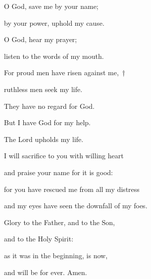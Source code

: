 \noindent O God, save me by your name;~\GreStar{}~\nopagebreak

by your power, uphold my cause.

\noindent O God, hear my prayer;~\GreStar{}~\nopagebreak

listen to the words of my mouth.

\noindent For proud men have risen against me,~†~\nopagebreak

ruthless men seek my life.~\GreStar{}~\nopagebreak

They have no regard for God.

\noindent But I have God for my help.~\GreStar{}~\nopagebreak

The Lord upholds my life.

\noindent I will sacrifice to you with willing heart~\GreStar{}~\nopagebreak

and praise your name for it is good:

\noindent for you have rescued me from all my distress~\GreStar{}~\nopagebreak

and my eyes have seen the downfall of my foes.

\noindent Glory to the Father, and to the Son,~\GreStar{}~\nopagebreak

and to the Holy Spirit:

\noindent as it was in the beginning, is now,~\GreStar{}~\nopagebreak

and will be for ever. Amen.